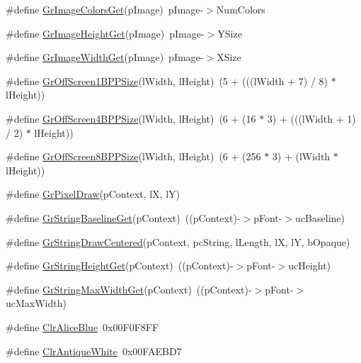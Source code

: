 \begin{DoxyCompactItemize}
\#define \hyperlink{group__primitives__api_gae64e1f422a10d1f6e778fa11feccb72b}{Gr\+Image\+Colors\+Get}(p\+Image)~p\+Image-\/$>$Num\+Colors
\item 
\#define \hyperlink{group__primitives__api_ga99e8800d6f4ad9a948cca8f8b5466d06}{Gr\+Image\+Height\+Get}(p\+Image)~p\+Image-\/$>$Y\+Size
\item 
\#define \hyperlink{group__primitives__api_gac5a818909f750ccef4de5b91e51b6bfb}{Gr\+Image\+Width\+Get}(p\+Image)~p\+Image-\/$>$X\+Size
\item 
\#define \hyperlink{group__primitives__api_gaaa796903bb03f6061dcd78226e2e5845}{Gr\+Off\+Screen1\+B\+P\+P\+Size}(l\+Width,  l\+Height)~(5 + (((l\+Width + 7) / 8) $\ast$ l\+Height))
\item 
\#define \hyperlink{group__primitives__api_ga9cec5735b48b66f596f323c01548bfec}{Gr\+Off\+Screen4\+B\+P\+P\+Size}(l\+Width,  l\+Height)~(6 + (16 $\ast$ 3) + (((l\+Width + 1) / 2) $\ast$ l\+Height))
\item 
\#define \hyperlink{group__primitives__api_ga7fac7401d41cd5fa18c98d209f0dad97}{Gr\+Off\+Screen8\+B\+P\+P\+Size}(l\+Width,  l\+Height)~(6 + (256 $\ast$ 3) + (l\+Width $\ast$ l\+Height))
\item 
\#define \hyperlink{group__primitives__api_gaec66cc4130bb7454a14080d6fed5c2c8}{Gr\+Pixel\+Draw}(p\+Context,  l\+X,  l\+Y)
\item 
\#define \hyperlink{group__primitives__api_ga1a557c1a7517cdc1e61e5728ee3969ff}{Gr\+String\+Baseline\+Get}(p\+Context)~((p\+Context)-\/$>$p\+Font-\/$>$uc\+Baseline)
\item 
\#define \hyperlink{group__primitives__api_ga4ab68eecbbfcca392b8d4642b681d912}{Gr\+String\+Draw\+Centered}(p\+Context,  pc\+String,  l\+Length,  l\+X,  l\+Y,  b\+Opaque)
\item 
\#define \hyperlink{group__primitives__api_ga258ddad68eadf9d1c03d1c0a97d3e215}{Gr\+String\+Height\+Get}(p\+Context)~((p\+Context)-\/$>$p\+Font-\/$>$uc\+Height)
\item 
\#define \hyperlink{group__primitives__api_gaca6b9b536d4b4584561e132de35db9f2}{Gr\+String\+Max\+Width\+Get}(p\+Context)~((p\+Context)-\/$>$p\+Font-\/$>$uc\+Max\+Width)
\item 
\#define \hyperlink{group__primitives__api_ga2b3c9de1a7707fe905767d241db6ac77}{Clr\+Alice\+Blue}~0x00\+F0\+F8\+F\+F
\item 
\#define \hyperlink{group__primitives__api_ga581775bdf6f916b683f8463b576a4b41}{Clr\+Antique\+White}~0x00\+F\+A\+E\+B\+D7
\item 

\end{DoxyCompactItemize}
